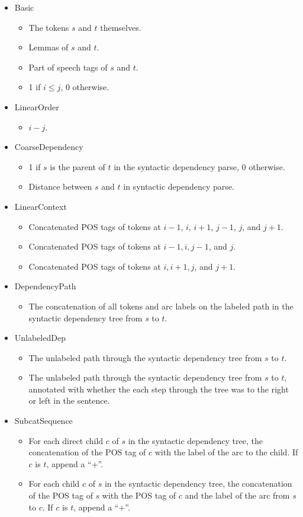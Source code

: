 \documentclass[11pt]{article}
\begin{document}
\begin{itemize}
	\item Basic
	\begin{itemize}
		\item The tokens $s$ and $t$ themselves.
		\item Lemmas of $s$ and $t$.
		\item Part of speech tags of $s$ and $t$.
		\item 1 if $i \le j$, 0 otherwise.
	\end{itemize}
	\item LinearOrder
		\begin{itemize}
		\item $i - j$.
	\end{itemize}
	\item CoarseDependency
		\begin{itemize}
		\item 1 if $s$ is the parent of $t$ in the syntactic dependency parse, 0
		otherwise.
		\item Distance between $s$ and $t$ in syntactic dependency parse.
	\end{itemize}
	\item LinearContext
		\begin{itemize}
		\item Concatenated POS tags of tokens at $i-1$, $i$, $i+1$, $j-1$, $j$,
		and $j+1$.
		\item Concatenated POS tags of tokens at $i-1, i, j-1$, and $j$.
		\item Concatenated POS tags of tokens at $i, i+1, j$, and $j+1$.
	\end{itemize}
	\item DependencyPath
		\begin{itemize}
		\item The concatenation of all tokens and arc labels on the labeled path in
		the syntactic dependency tree from $s$ to $t$.
	\end{itemize}
	\item UnlabeledDep
		\begin{itemize}
		\item The unlabeled path through the syntactic dependency tree from $s$ to $t$. 
		\item The unlabeled path through the syntactic dependency tree from $s$ to $t$,
		annotated with whether the each step through the tree was to the right or left in the sentence.
	\end{itemize}
	\item SubcatSequence
		\begin{itemize}
		\item For each direct child $c$ of $s$ in the syntactic dependency tree, the
		concatenation of the POS tag of $c$ with the label of the arc to the child.
		If $c$ is $t$, append a ``+''.
		\item For each child $c$ of $s$ in the syntactic dependency tree, the
		concatenation of the POS tag of $s$ with the POS tag of $c$ and the label of the
		arc from $s$ to $c$.
		If $c$ is $t$, append a ``+''.
	\end{itemize}
\end{itemize}
\end{document}
